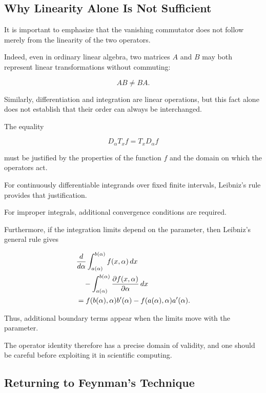 \documentclass[11pt,a4paper]{article}
\theoremstyle{definition}
\theoremstyle{remark}
\begin{document}
\subsection{Why Linearity Alone Is Not Sufficient}

It is important to emphasize
that the vanishing commutator
does not follow merely from
the linearity of the two
operators.

Indeed, even in ordinary
linear algebra, two matrices
$A$ and $B$ may both represent
linear transformations
without commuting:

\[
    AB\neq BA.
\]

Similarly, differentiation
and integration are linear
operations, but this fact
alone does not establish
that their order can
always be interchanged.

The equality

\[
    D_\alpha T_xf
    =
    T_xD_\alpha f
\]

must be justified by
the properties of the
function $f$ and the
domain on which the
operators act.

For continuously
differentiable integrands
over fixed finite
intervals, Leibniz's rule
provides that justification.

For improper integrals,
additional convergence
conditions are required.

Furthermore, if the
integration limits depend
on the parameter, then
Leibniz's general rule gives

\begin{align}
    &\frac{d}{d\alpha}
    \int_{a(\alpha)}^{b(\alpha)}
    f(x,\alpha)\,dx
    \notag\\
    &\quad-
    \int_{a(\alpha)}^{b(\alpha)}
    \frac{\partial f(x,\alpha)}
         {\partial\alpha}\,dx
    \notag\\
    &=
    f(b(\alpha),\alpha)b'(\alpha)
    -
    f(a(\alpha),\alpha)a'(\alpha).
\end{align}

Thus, additional boundary
terms appear when the
limits move with the
parameter.

The operator identity
therefore has a precise
domain of validity, and one should be careful before exploiting it in scientific computing.

\subsection{Returning to Feynman's Technique}
\end{document}
